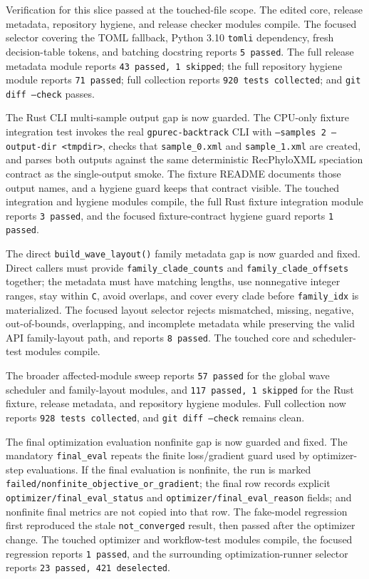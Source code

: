 \documentclass[11pt]{article}
\begin{document}
Verification for this slice passed at the touched-file scope.  The edited core,
release metadata, repository hygiene, and release checker modules compile.  The
focused selector covering the TOML fallback, Python 3.10 \texttt{tomli}
dependency, fresh decision-table tokens, and batching docstring reports
\texttt{5 passed}.  The full release metadata module reports
\texttt{43 passed, 1 skipped}; the full repository hygiene module reports
\texttt{71 passed}; full collection reports \texttt{920 tests collected}; and
\texttt{git diff --check} passes.

The Rust CLI multi-sample output gap is now guarded.  The CPU-only fixture
integration test invokes the real \texttt{gpurec-backtrack} CLI with
\texttt{--samples 2 --output-dir <tmpdir>}, checks that
\texttt{sample\_0.xml} and \texttt{sample\_1.xml} are created, and parses both
outputs against the same deterministic RecPhyloXML speciation contract as the
single-output smoke.  The fixture README documents those output names, and a
hygiene guard keeps that contract visible.  The touched integration and hygiene
modules compile, the full Rust fixture integration module reports
\texttt{3 passed}, and the focused fixture-contract hygiene guard reports
\texttt{1 passed}.

The direct \texttt{build\_wave\_layout()} family metadata gap is now guarded and
fixed.  Direct callers must provide \texttt{family\_clade\_counts} and
\texttt{family\_clade\_offsets} together; the metadata must have matching
lengths, use nonnegative integer ranges, stay within \texttt{C}, avoid overlaps,
and cover every clade before \texttt{family\_idx} is materialized.  The focused
layout selector rejects mismatched, missing, negative, out-of-bounds,
overlapping, and incomplete metadata while preserving the valid API family-layout
path, and reports \texttt{8 passed}.  The touched core and scheduler-test
modules compile.

The broader affected-module sweep reports \texttt{57 passed} for the global
wave scheduler and family-layout modules, and \texttt{117 passed, 1 skipped} for
the Rust fixture, release metadata, and repository hygiene modules.  Full
collection now reports \texttt{928 tests collected}, and
\texttt{git diff --check} remains clean.

The final optimization evaluation nonfinite gap is now guarded and fixed.  The
mandatory \texttt{final\_eval} repeats the finite loss/gradient guard used by
optimizer-step evaluations.  If the final evaluation is nonfinite, the run is
marked \texttt{failed/nonfinite\_objective\_or\_gradient}; the final row records
explicit \texttt{optimizer/final\_eval\_status} and
\texttt{optimizer/final\_eval\_reason} fields; and nonfinite final metrics are
not copied into that row.  The fake-model regression first reproduced the stale
\texttt{not\_converged} result, then passed after the optimizer change.  The
touched optimizer and workflow-test modules compile, the focused regression
reports \texttt{1 passed}, and the surrounding optimization-runner selector
reports \texttt{23 passed, 421 deselected}.
\end{document}
